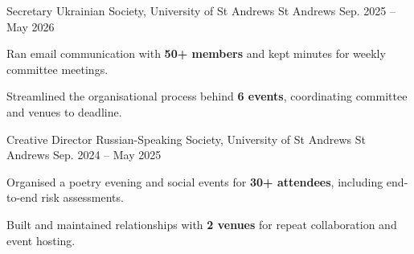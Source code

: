 

\begin{cventries}

  \cventry
    {Secretary} %
    {Ukrainian Society, University of St Andrews} %
    {St Andrews} %
    {Sep. 2025 -- May 2026} %
    {
      \begin{cvitems}
        \item {Ran email communication with \textbf{50+ members} and kept minutes for weekly committee meetings.}
        \item {Streamlined the organisational process behind \textbf{6 events}, coordinating committee and venues to deadline.}
      \end{cvitems}
    }

  \cventry
    {Creative Director} %
    {Russian-Speaking Society, University of St Andrews} %
    {St Andrews} %
    {Sep. 2024 -- May 2025} %
    {
      \begin{cvitems}
        \item {Organised a poetry evening and social events for \textbf{30+ attendees}, including end-to-end risk assessments.}
        \item {Built and maintained relationships with \textbf{2 venues} for repeat collaboration and event hosting.}
      \end{cvitems}
    }

\end{cventries}
